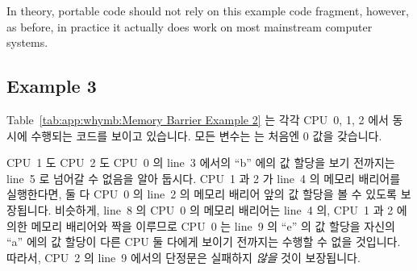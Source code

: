 In theory, portable code should not rely on this example code fragment,
however, as before, in practice it actually does work on most
mainstream computer systems.
\fi

\subsection{Example 3}
\label{sec:app:whymb:Example 3}

Table~\ref{tab:app:whymb:Memory Barrier Example 2} 는 각각 CPU~0, 1, 2 에서
동시에 수행되는 코드를 보이고 있습니다.
모든 변수는 는 처음엔 0 값을 갖습니다.
\iffalse

Table~\ref{tab:app:whymb:Memory Barrier Example 3}
shows three code fragments, executed concurrently by CPUs~0, 1, and 2.
All variables are initially zero.
\fi

\begin{table*}
\scriptsize
{}
\caption{Memory Barrier Example 3}
\label{tab:app:whymb:Memory Barrier Example 3}
\end{table*}

CPU~1 도 CPU~2 도 CPU~0 의 line~3 에서의 ``b'' 에의 값 할당을 보기 전까지는
line~5 로 넘어갈 수 없음을 알아 둡시다.
CPU~1 과 2 가 line~4 의 메모리 배리어를 실행한다면, 둘 다 CPU~0 의 line~2 의
메모리 배리어 앞의 값 할당을 볼 수 있도록 보장됩니다.
비슷하게, line~8 의 CPU~0 의 메모리 배리어는 line~4 의, CPU~1 과 2 에 의한
메모리 배리어와 짝을 이루므로 CPU~0 는 line~9 의 ``e'' 의 값 할당을 자신의
``a'' 에의 값 할당이 다른 CPU 둘 다에게 보이기 전까지는 수행할 수 없을
것입니다.
따라서, CPU~2 의 line~9 에서의 단정문은 실패하지 \emph{않을} 것이 보장됩니다.
\iffalse

